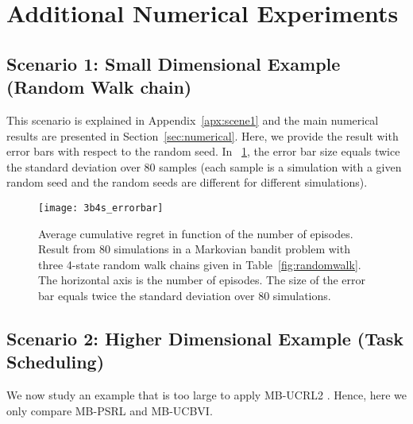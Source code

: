 \section{Additional Numerical Experiments}
\label{apx:add_numerical}

\subsection{Scenario 1: Small Dimensional Example (Random Walk chain)}
\label{sssec:random_walk}

This scenario is explained in Appendix~\ref{apx:scene1} and the main numerical results are presented in Section~\ref{sec:numerical}. Here, we provide the result with error bars with respect to the random seed. In \figurename~\ref{fig:randomwalk_3b4s_errorbar}, the error bar size equals twice the standard deviation over 80 samples (each sample is a simulation with a given random seed and the random seeds are different for different simulations).

\begin{figure}[ht]
    \center
    \texttt{[image: 3b4s\_errorbar]}
    \caption{Average cumulative regret in function of the number of episodes. Result from 80 simulations in a Markovian bandit problem with three 4-state random walk chains given in Table~\ref{fig:randomwalk}. The horizontal axis is the number of episodes. The size of the error bar equals twice the standard deviation over 80 simulations.}
    \label{fig:randomwalk_3b4s_errorbar}
\end{figure}

\subsection{Scenario 2: Higher Dimensional Example (Task Scheduling)}
\label{sssec:task_scheduling}

We now study an example that is too large to apply MB-UCRL2 . Hence, here we only compare MB-PSRL and MB-UCBVI. 

